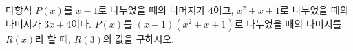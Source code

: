 다항식 $P(x)$를 $x-1$로 나누었을 때의 나머지가 $4$이고, $x^2+x+1$로 나누었을 때의 나머지가 $3x+4$이다. $P(x)$를 $(x-1)(x^2+x+1)$로 나누었을 때의 나머지를 $R(x)$라 할 때, $R(3)$의 값을 구하시오.
